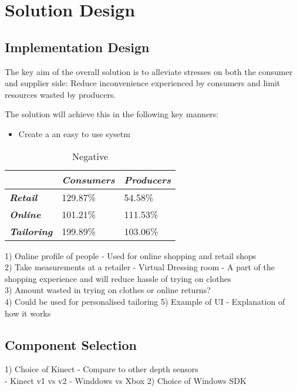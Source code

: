 \chapter{Solution Design}

\section{Implementation Design}


The key aim of the overall solution is to alleviate stresses on both the consumer and supplier side: Reduce inconvenience experienced by consumers and limit resources wasted by producers.

The solution will achieve this in the following key manners:
\begin{itemize}
	\item Create a an easy to use sysetm
\end{itemize} 


\begin{table}[htbp]
	\centering
	\caption{Negative}
	\begin{tabularx}{\textwidth}{|Y|Y|Y|}
		\toprule
		& 
		\textit{\textbf{Consumers}} & 
		\textit{\textbf{Producers}} \\
		\midrule
		\textit{\textbf{Retail}} & 
		129.87\% & 
		54.58\% \\
		\midrule
		\textit{\textbf{Online}} & 
		101.21\% & 
		111.53\% \\
		\midrule
		\textit{\textbf{Tailoring}} & 
		199.89\% & 
		103.06\% \\
		\bottomrule
	\end{tabularx}%
	\label{tab:consumerProducerHassles}%
\end{table}%

1) Online profile of people - Used for online shopping and retail shops\\
2) Take measurements at a retailer - Virtual Dressing room - A part of the shopping experience and will reduce hassle of trying on clothes\\
3) Amount wasted in trying on clothes or online returns?\\
4) Could be used for personalised tailoring
5) Example of UI - Explanation of how it works

\section{Component Selection}
1) Choice of Kinect - Compare to other depth sensors\\
- Kinect v1 vs v2
- Winddows vs Xbox
2) Choice of Windows SDK\\

